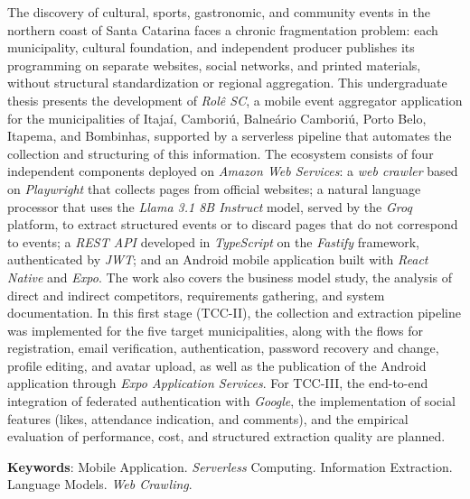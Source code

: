 \begin{Abstract}
The discovery of cultural, sports, gastronomic, and community events in the northern coast of Santa Catarina faces a chronic fragmentation problem: each municipality, cultural foundation, and independent producer publishes its programming on separate websites, social networks, and printed materials, without structural standardization or regional aggregation. This undergraduate thesis presents the development of \textit{Rolê SC}, a mobile event aggregator application for the municipalities of Itajaí, Camboriú, Balneário Camboriú, Porto Belo, Itapema, and Bombinhas, supported by a serverless pipeline that automates the collection and structuring of this information. The ecosystem consists of four independent components deployed on \textit{Amazon Web Services}: a \textit{web crawler} based on \textit{Playwright} that collects pages from official websites; a natural language processor that uses the \textit{Llama 3.1 8B Instruct} model, served by the \textit{Groq} platform, to extract structured events or to discard pages that do not correspond to events; a \textit{REST API} developed in \textit{TypeScript} on the \textit{Fastify} framework, authenticated by \textit{JWT}; and an Android mobile application built with \textit{React Native} and \textit{Expo}. The work also covers the business model study, the analysis of direct and indirect competitors, requirements gathering, and system documentation. In this first stage (TCC-II), the collection and extraction pipeline was implemented for the five target municipalities, along with the flows for registration, email verification, authentication, password recovery and change, profile editing, and avatar upload, as well as the publication of the Android application through \textit{Expo Application Services}. For TCC-III, the end-to-end integration of federated authentication with \textit{Google}, the implementation of social features (likes, attendance indication, and comments), and the empirical evaluation of performance, cost, and structured extraction quality are planned.

\textbf{Keywords}: Mobile Application. \textit{Serverless} Computing. Information Extraction. Language Models. \textit{Web Crawling}.
\end{Abstract}


\listoffigures*
\cleardoublepage

\listoftables*
\cleardoublepage


